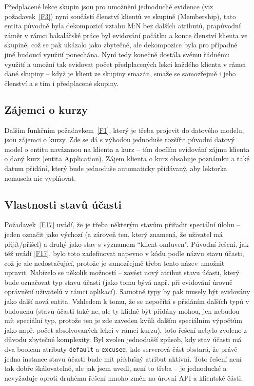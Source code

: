 Předplacené lekce skupin jsou pro umožnění jednoduché evidence (viz požadavek~\ref{F3}) nyní součástí členství klientů ve skupině (Membership), tato entita původně byla dekompozicí vztahu M:N bez dalších atributů, prapůvodní záměr v rámci bakalářské práce byl evidování počátku a konce členství klienta ve skupině, což se pak ukázalo jako zbytečné, ale dekompozice byla pro případné jiné budoucí využití ponechána. Nyní tedy konečně dostála svému řádnému využití a umožní tak evidovat počet předplacených lekcí každého klienta v rámci dané skupiny -- když je klient ze skupiny smazán, smaže se samozřejmě i jeho členství a s tím i předplacené skupiny.

\subsection{Zájemci o kurzy}

Dalším funkčním požadavkem~\ref{F1}, který je třeba projevit do datového modelu, jsou zájemci o kurzy. Zde se dá s výhodou jednoduše rozšířit původní datový model o entitu navázanou na klienta a kurz -- tím docílím evidování zájmu klienta o daný kurz (entita Application). Zájem klienta o kurz obsahuje poznámku a také datum přidání, který bude jednoduše automaticky přidávaný, aby lektorka nemusela nic vyplňovat.

\subsection{Vlastnosti stavů účasti}

Požadavek~\ref{F17} uvádí, že je třeba některým stavům přiřadit speciální úlohu -- jeden označit jako výchozí (a zároveň ten, který znamená, že uživatel má přijít/přišel) a druhý jako stav s významem \enquote{klient omluven}. Původní řešení, jak též uvádí \ref{F17}, bylo toto zadefinovat napevno v kódu podle názvu stavu účasti, což je ale nedostačující, protože je samozřejmě třeba tento název umožnit upravit. Nabízelo se několik možností -- zavést nový atribut stavu účasti, který bude označovat typ stavu účasti (jako tomu bývá např. při evidování úrovně oprávnění uživatelů v rámci aplikací). Samotné typy by pak musely být evidovány jako další nová entita. Vzhledem k tomu, že se nepočítá s přidáním dalších typů v budoucnu (stavů účasti také ne, ale ty klidně být přidány mohou, jen nebudou mít speciální typ, protože ten je zde zaveden kvůli dalším speciálním výpočtům jako např. počet absolvovaných lekcí v rámci kurzu), toto řešení nebylo zvoleno z důvodu zbytečné komplexity. Byl zvolen jednodušší způsob, kdy stav účasti má dva boolean atributy \verb|default| a \verb|excused|, kde serverová část obstará, že právě jedna instance stavu účasti bude mít příslušný atribut aktivní. Toto řešení není tak dobře škálovatelné, ale jak jsem uvedl, není to třeba -- je jednoduché a nevyžaduje oproti druhému řešení mnoho změn na úrovni API a klientské části.

